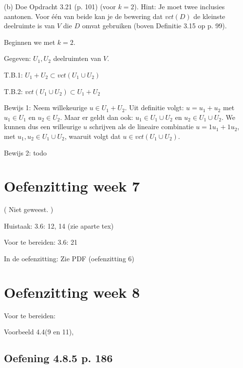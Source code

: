 \documentclass{article}
\begin{document}
(b) Doe Opdracht 3.21 (p. 101) (voor $k = 2$). Hint: Je moet twee inclusies aantonen. Voor \'e\'en van beide kan je de bewering dat $vct(D)$ de kleinste deelruimte is van $V$ die $D$ omvat gebruiken (boven Definitie 3.15 op p. 99). 

Beginnen we met $k=2$. 

Gegeven: $U_1,U_2$ deelruimten van $V$. 

T.B.1: $U_1+U_2 \subset vct(U_1 \cup U_2)$

T.B.2: $vct(U_1 \cup U_2) \subset U_1+U_2  $

Bewijs 1: Neem willekeurige $u \in U_1+U_2$. Uit definitie volgt: $u = u_1 + u_2$ met $u_1 \in U_1$ en $u_2 \in U_2$. Maar er geldt dan ook: $u_1 \in U_1 \cup U_2$ en $u_2 \in U_1 \cup U_2$. We kunnen dus een willeurige $u$ schrijven als de lineaire combinatie $u = 1 u_1 + 1u_2$, met $u_1,u_2 \in  U_1 \cup U_2$, waaruit volgt dat $u \in vct(U_1 \cup U_2)$. 

Bewijs 2: todo 



\section{Oefenzitting week 7}

( Niet geweest. )

Huistaak: 3.6: 12, 14 (zie aparte tex) 

Voor te bereiden: 3.6: 21

In de oefenzitting: Zie PDF (oefenzitting 6) 




\section{Oefenzitting week 8}

Voor te bereiden: 

Voorbeeld 4.4(9 en 11), 

\subsection{Oefening 4.8.5 p. 186}
\end{document}
